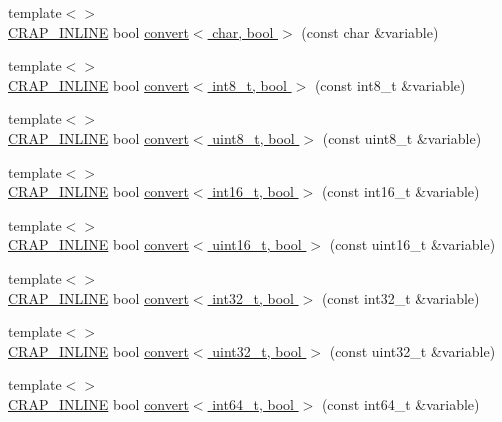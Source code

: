 \begin{DoxyCompactItemize}
\item 
{\footnotesize template$<$$>$ }\\\hyperlink{config__x86_8h_a5a40526b8d842e7ff731509998bb0f1c}{C\+R\+A\+P\+\_\+\+I\+N\+L\+I\+N\+E} bool \hyperlink{namespacecrap_ac92695a46199663eabfa2f1a29e96475}{convert$<$ char, bool $>$} (const char \&variable)
\item 
{\footnotesize template$<$$>$ }\\\hyperlink{config__x86_8h_a5a40526b8d842e7ff731509998bb0f1c}{C\+R\+A\+P\+\_\+\+I\+N\+L\+I\+N\+E} bool \hyperlink{namespacecrap_aeb0c1bbaf9cb330ede0c702008805e30}{convert$<$ int8\+\_\+t, bool $>$} (const int8\+\_\+t \&variable)
\item 
{\footnotesize template$<$$>$ }\\\hyperlink{config__x86_8h_a5a40526b8d842e7ff731509998bb0f1c}{C\+R\+A\+P\+\_\+\+I\+N\+L\+I\+N\+E} bool \hyperlink{namespacecrap_a8b20a47b283dc5534122e5fe29631b3a}{convert$<$ uint8\+\_\+t, bool $>$} (const uint8\+\_\+t \&variable)
\item 
{\footnotesize template$<$$>$ }\\\hyperlink{config__x86_8h_a5a40526b8d842e7ff731509998bb0f1c}{C\+R\+A\+P\+\_\+\+I\+N\+L\+I\+N\+E} bool \hyperlink{namespacecrap_a867fa097545f048e8f4af21e1527b9d3}{convert$<$ int16\+\_\+t, bool $>$} (const int16\+\_\+t \&variable)
\item 
{\footnotesize template$<$$>$ }\\\hyperlink{config__x86_8h_a5a40526b8d842e7ff731509998bb0f1c}{C\+R\+A\+P\+\_\+\+I\+N\+L\+I\+N\+E} bool \hyperlink{namespacecrap_ae43a81903acd28785d050ba4b12e6f99}{convert$<$ uint16\+\_\+t, bool $>$} (const uint16\+\_\+t \&variable)
\item 
{\footnotesize template$<$$>$ }\\\hyperlink{config__x86_8h_a5a40526b8d842e7ff731509998bb0f1c}{C\+R\+A\+P\+\_\+\+I\+N\+L\+I\+N\+E} bool \hyperlink{namespacecrap_a749f938b808d7ef790e816c792054e32}{convert$<$ int32\+\_\+t, bool $>$} (const int32\+\_\+t \&variable)
\item 
{\footnotesize template$<$$>$ }\\\hyperlink{config__x86_8h_a5a40526b8d842e7ff731509998bb0f1c}{C\+R\+A\+P\+\_\+\+I\+N\+L\+I\+N\+E} bool \hyperlink{namespacecrap_a8dbc15ac6e25698450ac54398312af8f}{convert$<$ uint32\+\_\+t, bool $>$} (const uint32\+\_\+t \&variable)
\item 
{\footnotesize template$<$$>$ }\\\hyperlink{config__x86_8h_a5a40526b8d842e7ff731509998bb0f1c}{C\+R\+A\+P\+\_\+\+I\+N\+L\+I\+N\+E} bool \hyperlink{namespacecrap_a6d8d2d7af3e2ca06073976a95dce1a19}{convert$<$ int64\+\_\+t, bool $>$} (const int64\+\_\+t \&variable)

\end{DoxyCompactItemize}
